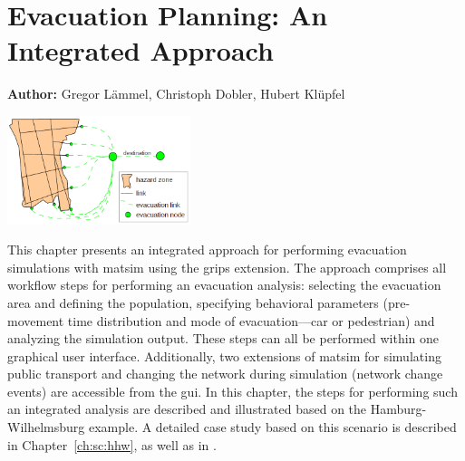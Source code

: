 \chapter{Evacuation Planning: An Integrated Approach}
\label{ch:evacuation}

\hfill \textbf{Author:} Gregor Lämmel, Christoph Dobler, Hubert Klüpfel 

\begin{center} \includegraphics[width=0.4\textwidth, angle=0]{extending/figures/Evacuation/evacuation} \end{center}



This chapter presents an integrated approach for performing evacuation simulations with \gls{matsim} using the \gls{grips} extension. %
The approach comprises all workflow steps for performing an evacuation analysis: \ie selecting the evacuation area and defining the population, specifying  behavioral parameters (\ie  pre-movement time distribution and mode of evacuation---car or pedestrian) and analyzing the simulation output. These steps can all be performed within one graphical user interface. Additionally, two extensions of \gls{matsim} for simulating public transport and changing the network during simulation (\ie network change events) are accessible from the \gls{gui}. In this chapter, the steps for performing such an integrated analysis are described and illustrated based on the Hamburg-Wilhelmsburg example. A detailed case study based on this scenario is described in Chapter~\ref{ch:sc:hhw}, as well as in \citet{00DurstAtAl2012PEDGRIPSAppl,Hugenbusch2012Bachelor}.

